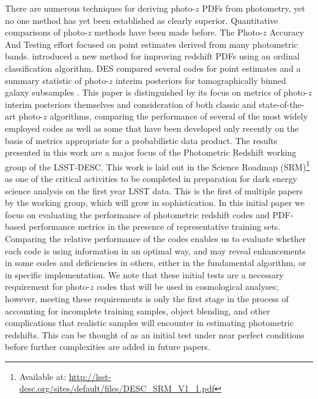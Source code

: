 There are numerous techniques for deriving photo-$z$ PDFs from photometry, yet no one method has yet been established as clearly superior.
Quantitative comparisons of photo-$z$ methods have been made before.
The Photo-$z$ Accuracy And Testing \citep[PHAT,][]{Hildebrandt:10} effort focused on point estimates derived from many photometric bands.  \citet{Rau:2015} introduced a new method for improving redshift PDFs using an ordinal classification algorithm.
DES compared several codes for point estimates \citep{Sanchez:14} and a summary statistic of photo-$z$ interim posteriors for tomographically binned galaxy subsamples \citep{Bonnett:16}.  
This paper is distinguished by its focus on metrics of photo-$z$ interim posteriors themselves and consideration of both classic and state-of-the-art photo-$z$ algorithms, comparing the performance of several of the most widely employed codes as well as some that have been developed only recently on the basis of metrics appropriate for a probabilistic data product.
The results presented in this work are
a major focus of the Photometric Redshift working group of the LSST-DESC.
This work is laid out in the Science Roadmap (SRM)\footnote{Available at: \url{http://lsst-desc.org/sites/default/files/DESC_SRM_V1_1.pdf}} as one of the critical activities to be completed in preparation for dark energy science analysis on the first year LSST data.
This is the first of multiple papers by the working group, which will grow in sophistication.
In this initial paper we focus on evaluating the performance of photometric redshift codes and PDF-based performance metrics in the presence of representative training sets.
Comparing the relative performance of the codes enables us to evaluate whether each code is using information in an optimal way, and may reveal enhancements in some codes and deficiencies in others, either in the fundamental algorithm, or in specific implementation.  We note that these initial tests are a necessary requirement for photo-$z$ codes that will be used in cosmological analyses; however, meeting these requirements is only the first stage in the process of accounting for incomplete training samples, object blending, and other complications that realistic samples will encounter in estimating photometric redshifts.  This can be thought of as an initial test under near perfect conditions before further complexities are added in future papers.

